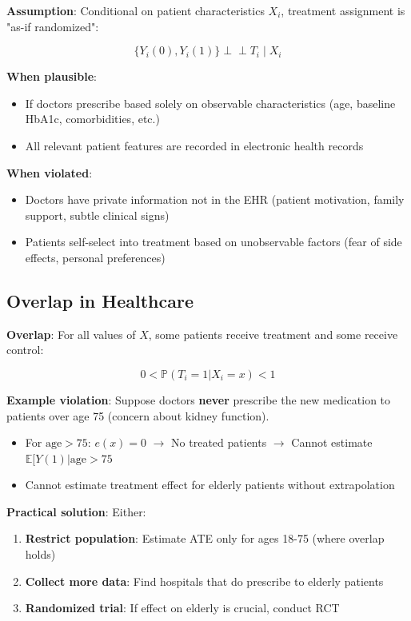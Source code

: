 \textbf{Assumption}: Conditional on patient characteristics \(X_i\),
treatment assignment is "as-if randomized":

\[\{Y_i(0), Y_i(1)\} \perp\!\!\!\perp T_i \mid X_i\]

\textbf{When plausible}:
\begin{itemize}
\item If doctors prescribe based solely on observable characteristics (age, baseline HbA1c, comorbidities, etc.)
\item All relevant patient features are recorded in electronic health records
\end{itemize}

\textbf{When violated}:
\begin{itemize}
\item Doctors have private information not in the EHR (patient motivation, family support, subtle clinical signs)
\item Patients self-select into treatment based on unobservable factors (fear of side effects, personal preferences)
\end{itemize}

\subsection{Overlap in Healthcare}\label{_overlap_in_healthcare}

\textbf{Overlap}: For all values of \(X\), some patients receive
treatment and some receive control:

\[0 < \mathbb{P}(T_i = 1 | X_i = x) < 1\]

\textbf{Example violation}: Suppose doctors \textbf{never} prescribe the
new medication to patients over age 75 (concern about kidney function).

\begin{itemize}
\item
  For \(\text{age} > 75\): \(e(x) = 0\) $\to$ No treated patients $\to$ Cannot
  estimate \(\mathbb{E}[Y(1) | \text{age} > 75\)
\item
  Cannot estimate treatment effect for elderly patients without
  extrapolation
\end{itemize}

\textbf{Practical solution}: Either:
\begin{enumerate}
\item \textbf{Restrict population}: Estimate ATE only for ages 18-75 (where overlap holds)
\item \textbf{Collect more data}: Find hospitals that do prescribe to elderly patients
\item \textbf{Randomized trial}: If effect on elderly is crucial, conduct RCT
\end{enumerate}

